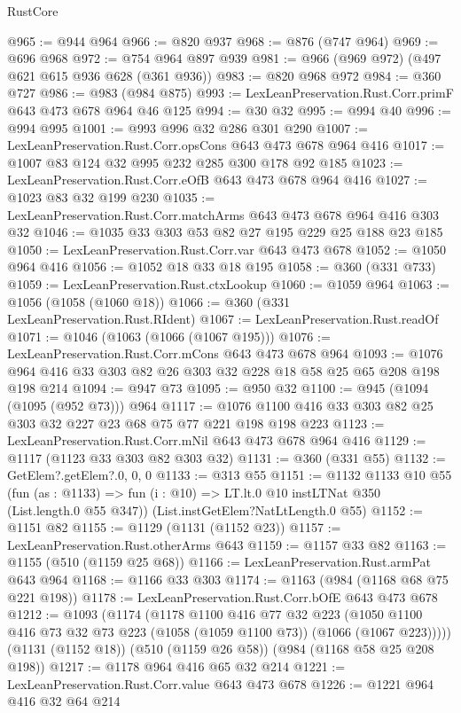 \begin{lexlean}{RustCore}
\begin{coremodule}
@965 := @944 @964
@966 := @820 @937
@968 := @876 (@747 @964)
@969 := @696 @968
@972 := @754 @964 @897 @939
@981 := @966 (@969 @972) (@497 @621 @615 @936 @628 (@361 @936))
@983 := @820 @968 @972
@984 := @360 @727
@986 := @983 (@984 @875)
@993 := LexLeanPreservation.Rust.Corr.primF @643 @473 @678 @964 @46 @125
@994 := @30 @32
@995 := @994 @40
@996 := @994 @995
@1001 := @993 @996 @32 @286 @301 @290
@1007 := LexLeanPreservation.Rust.Corr.opsCons @643 @473 @678 @964 @416
@1017 := @1007 @83 @124 @32 @995 @232 @285 @300 @178 @92 @185
@1023 := LexLeanPreservation.Rust.Corr.eOfB @643 @473 @678 @964 @416
@1027 := @1023 @83 @32 @199 @230
@1035 := LexLeanPreservation.Rust.Corr.matchArms @643 @473 @678 @964 @416 @303 @32
@1046 := @1035 @33 @303 @53 @82 @27 @195 @229 @25 @188 @23 @185
@1050 := LexLeanPreservation.Rust.Corr.var @643 @473 @678
@1052 := @1050 @964 @416
@1056 := @1052 @18 @33 @18 @195
@1058 := @360 (@331 @733)
@1059 := LexLeanPreservation.Rust.ctxLookup
@1060 := @1059 @964
@1063 := @1056 (@1058 (@1060 @18))
@1066 := @360 (@331 LexLeanPreservation.Rust.RIdent)
@1067 := LexLeanPreservation.Rust.readOf
@1071 := @1046 (@1063 (@1066 (@1067 @195)))
@1076 := LexLeanPreservation.Rust.Corr.mCons @643 @473 @678 @964
@1093 := @1076 @964 @416 @33 @303 @82 @26 @303 @32 @228 @18 @58 @25 @65 @208 @198 @198 @214
@1094 := @947 @73
@1095 := @950 @32
@1100 := @945 (@1094 (@1095 (@952 @73))) @964
@1117 := @1076 @1100 @416 @33 @303 @82 @25 @303 @32 @227 @23 @68 @75 @77 @221 @198 @198 @223
@1123 := LexLeanPreservation.Rust.Corr.mNil @643 @473 @678 @964 @416
@1129 := @1117 (@1123 @33 @303 @82 @303 @32)
@1131 := @360 (@331 @55)
@1132 := GetElem?.getElem?.{0, 0, 0}
@1133 := @313 @55
@1151 := @1132
    @1133
    @10
    @55
    (fun (as : @1133) => fun (i : @10) => LT.lt.{0} @10 instLTNat @350 (List.length.{0} @55 @347))
    (List.instGetElem?NatLtLength.{0} @55)
@1152 := @1151 @82
@1155 := @1129 (@1131 (@1152 @23))
@1157 := LexLeanPreservation.Rust.otherArms @643
@1159 := @1157 @33 @82
@1163 := @1155 (@510 (@1159 @25 @68))
@1166 := LexLeanPreservation.Rust.armPat @643 @964
@1168 := @1166 @33 @303
@1174 := @1163 (@984 (@1168 @68 @75 @221 @198))
@1178 := LexLeanPreservation.Rust.Corr.bOfE @643 @473 @678
@1212 := @1093
    (@1174
      (@1178
        @1100
        @416
        @77
        @32
        @223
        (@1050 @1100 @416 @73 @32 @73 @223 (@1058 (@1059 @1100 @73)) (@1066 (@1067 @223)))))
    (@1131 (@1152 @18))
    (@510 (@1159 @26 @58))
    (@984 (@1168 @58 @25 @208 @198))
@1217 := @1178 @964 @416 @65 @32 @214
@1221 := LexLeanPreservation.Rust.Corr.value @643 @473 @678
@1226 := @1221 @964 @416 @32 @64 @214

\end{coremodule}
\end{lexlean}
